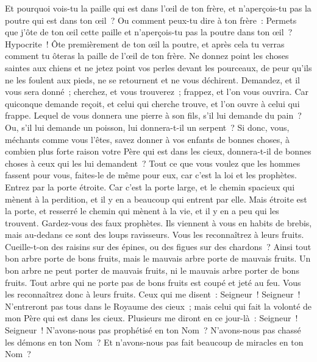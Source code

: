 \begin{multicols}{2}
Et pourquoi vois-tu la paille qui est dans l'œil de ton frère, et n'aperçois-tu pas la poutre qui est dans ton œil~?
Ou comment peux-tu dire à ton frère~: Permets que j'ôte de ton œil cette paille et n'aperçois-tu pas la poutre dans ton œil~?
Hypocrite~! Ôte premièrement de ton œil la poutre, et après cela tu verras comment tu ôteras la paille de l'œil de ton frère.
Ne donnez point les choses saintes aux chiens et ne jetez point vos perles devant les pourceaux, de peur qu'ils ne les foulent aux pieds, ne se retournent et ne vous déchirent.
Demandez, et il vous sera donné~; cherchez, et vous trouverez~; frappez, et l'on vous ouvrira.
Car quiconque demande reçoit, et celui qui cherche trouve, et l'on ouvre à celui qui frappe.
Lequel de vous donnera une pierre à son fils, s'il lui demande du pain~?
Ou, s'il lui demande un poisson, lui donnera-t-il un serpent~?
Si donc, vous, méchants comme vous l'êtes, savez donner à vos enfants de bonnes choses, à combien plus forte raison votre Père qui est dans les cieux, donnera-t-il de bonnes choses à ceux qui les lui demandent~?
Tout ce que vous voulez que les hommes fassent pour vous, faites-le de même pour eux, car c'est la loi et les prophètes.
Entrez par la porte étroite. Car c'est la porte large, et le chemin spacieux qui mènent à la perdition, et il y en a beaucoup qui entrent par elle.
Mais étroite est la porte, et resserré le chemin qui mènent à la vie, et il y en a peu qui les trouvent.
Gardez-vous des faux prophètes. Ils viennent à vous en habits de brebis, mais au-dedans ce sont des loups ravisseurs.
Vous les reconnaîtrez à leurs fruits. Cueille-t-on des raisins sur des épines, ou des figues sur des chardons~?
Ainsi tout bon arbre porte de bons fruits, mais le mauvais arbre porte de mauvais fruits.
Un bon arbre ne peut porter de mauvais fruits, ni le mauvais arbre porter de bons fruits.
Tout arbre qui ne porte pas de bons fruits est coupé et jeté au feu.
Vous les reconnaîtrez donc à leurs fruits.
Ceux qui me disent~: Seigneur~! Seigneur~! N'entreront pas tous dans le Royaume des cieux~; mais celui qui fait la volonté de mon Père qui est dans les cieux.
Plusieurs me diront en ce jour-là~: Seigneur~! Seigneur~! N'avons-nous pas prophétisé en ton Nom~? N'avons-nous pas chassé les démons en ton Nom~? Et n'avons-nous pas fait beaucoup de miracles en ton Nom~?

\end{multicols}
